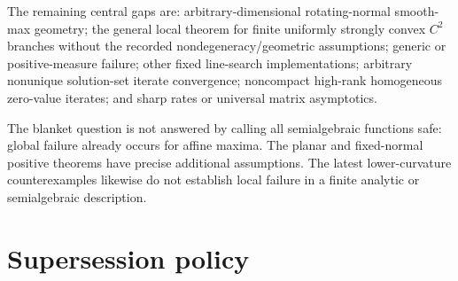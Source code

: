 The remaining central gaps are: arbitrary-dimensional rotating-normal smooth-max geometry; the general local theorem for finite uniformly strongly convex \(C^2\) branches without the recorded nondegeneracy/geometric assumptions; generic or positive-measure failure; other fixed line-search implementations; arbitrary nonunique solution-set iterate convergence; noncompact high-rank homogeneous zero-value iterates; and sharp rates or universal matrix asymptotics.

The blanket question is not answered by calling all semialgebraic functions safe: global failure already occurs for affine maxima. The planar and fixed-normal positive theorems have precise additional assumptions. The latest lower-curvature counterexamples likewise do not establish local failure in a finite analytic or semialgebraic description.

\section{Supersession policy}\label{supersession-policy}

